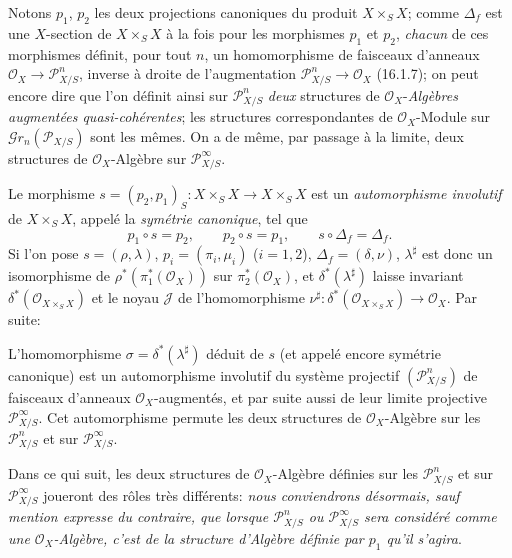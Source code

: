 \begin{env}[16.3.2]
\label{IV.16.3.2}
Notons $p_1$, $p_2$ les deux projections canoniques du produit $X\times_S X$;
comme $\Delta_f$ est une $X$-section de $X\times_S X$ à la fois pour les
morphismes $p_1$ et $p_2$, \emph{chacun} de ces morphismes définit, pour tout $n$, un
homomorphisme de faisceaux d'anneaux $\mathcal{O}_X\to\mathscr{P}_{X/S}^n$,
inverse à droite de l'augmentation $\mathscr{P}_{X/S}^n\to\mathcal{O}_X$
(16.1.7); on peut encore dire que l'on définit ainsi sur
$\mathscr{P}_{X/S}^n$ \emph{deux} structures de $\mathcal{O}_X$-\emph{Algèbres augmentées
quasi-cohérentes}; les structures correspondantes de $\mathcal{O}_X$-Module sur
$\mathscr{G}r_n(\mathscr{P}_{X/S})$ sont les mêmes. On a de même, par passage à
la limite, deux structures de $\mathcal{O}_X$-Algèbre sur
$\mathscr{P}_{X/S}^\infty$.
\end{env}

\begin{env}[16.3.3]
Le morphisme $s=(p_2,p_1)_S:X\times_S X\to X\times_S X$ est un \emph{automorphisme
involutif} de $X\times_S X$, appelé la \emph{symétrie canonique}, tel que
\[
  p_1\circ s=p_2,\qquad p_2\circ s=p_1,\qquad s\circ\Delta_f=\Delta_f.
  \tag{16.3.3.1}
  \label{IV.16.3.3.1}
\]
Si l'on pose $s=(\rho,\lambda)$, $p_i=(\pi_i,\mu_i)$ ($i=1,2$),
$\Delta_f=(\delta,\nu)$, $\lambda^\sharp$ est donc un isomorphisme de
$\rho^*(\pi_1^*(\mathcal{O}_X))$ sur $\pi_2^*(\mathcal{O}_X)$, et
$\delta^*(\lambda^\sharp)$ laisse invariant $\delta^*(\mathcal{O}_{X\times_S X})$
et le noyau $\mathscr{J}$ de l'homomorphisme
$\nu^\sharp:\delta^*(\mathcal{O}_{X\times_S X})\to\mathcal{O}_X$. Par suite:
\end{env}

\begin{proposition}[16.3.4]
L'homomorphisme $\sigma=\delta^*(\lambda^\sharp)$ déduit de $s$ \textup{(et appelé encore}
symétrie canonique\textup{)} est un automorphisme involutif du système projectif
$(\mathscr{P}_{X/S}^n)$ de faisceaux
d'anneaux $\mathcal{O}_X$-augmentés, et par suite aussi de leur limite projective
$\mathscr{P}_{X/S}^\infty$. Cet automorphisme permute les deux structures de
$\mathcal{O}_X$-Algèbre sur les $\mathscr{P}_{X/S}^n$ et sur
$\mathscr{P}_{X/S}^\infty$.
\end{proposition}

\begin{env}[16.3.5]
\label{IV.16.3.5}
Dans ce qui suit, les deux structures de $\mathcal{O}_X$-Algèbre définies sur les
$\mathscr{P}_{X/S}^n$ et sur $\mathscr{P}_{X/S}^\infty$ joueront des rôles très
différents: \emph{nous conviendrons désormais, sauf mention expresse du contraire,
que lorsque $\mathscr{P}_{X/S}^n$ ou $\mathscr{P}_{X/S}^\infty$ sera considéré
comme une $\mathcal{O}_X$-Algèbre, c'est de la structure d'Algèbre définie par
$p_1$ qu'il s'agira}.
\end{env}

